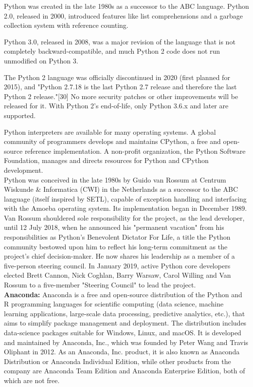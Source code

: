 \documentclass[oneside,a4paper,12pt]{report}
\begin{document}
Python was created in the late 1980s as a successor to the ABC language. Python 2.0, released in 2000, introduced features like list comprehensions and a garbage collection system with reference counting.

Python 3.0, released in 2008, was a major revision of the language that is not completely backward-compatible, and much Python 2 code does not run unmodified on Python 3.

The Python 2 language was officially discontinued in 2020 (first planned for 2015), and "Python 2.7.18 is the last Python 2.7 release and therefore the last Python 2 release."[30] No more security patches or other improvements will be released for it. With Python 2's end-of-life, only Python 3.6.x and later are supported.

Python interpreters are available for many operating systems. A global community of programmers develops and maintains CPython, a free and open-source reference implementation. A non-profit organization, the Python Software Foundation, manages and directs resources for Python and CPython development.\\

Python was conceived in the late 1980s by Guido van Rossum at Centrum Wiskunde & Informatica (CWI) in the Netherlands as a successor to the ABC language (itself inspired by SETL), capable of exception handling and interfacing with the Amoeba operating system. Its implementation began in December 1989. Van Rossum shouldered sole responsibility for the project, as the lead developer, until 12 July 2018, when he announced his "permanent vacation" from his responsibilities as Python's Benevolent Dictator For Life, a title the Python community bestowed upon him to reflect his long-term commitment as the project's chief decision-maker. He now shares his leadership as a member of a five-person steering council. In January 2019, active Python core developers elected Brett Cannon, Nick Coghlan, Barry Warsaw, Carol Willing and Van Rossum to a five-member "Steering Council" to lead the project.\\
\newpage
\textbf{Anaconda:}
Anaconda is a free and open-source distribution of the Python and R programming languages for scientific computing (data science, machine learning applications, large-scale data processing, predictive analytics, etc.), that aims to simplify package management and deployment. The distribution includes data-science packages suitable for Windows, Linux, and macOS. It is developed and maintained by Anaconda, Inc., which was founded by Peter Wang and Travis Oliphant in 2012. As an Anaconda, Inc. product, it is also known as Anaconda Distribution or Anaconda Individual Edition, while other products from the company are Anaconda Team Edition and Anaconda Enterprise Edition, both of which are not free.
\end{document}
